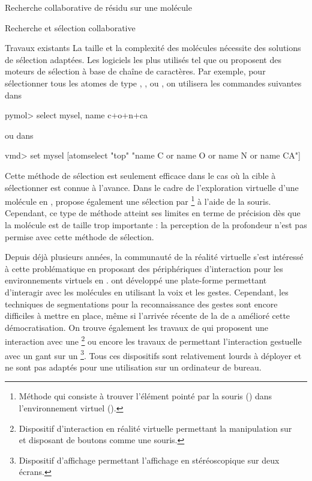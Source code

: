 \documentclass[myfrancais,ngerman,english,frenchb]{mythesis}
\begin{document}
\begin{mychapter}{Recherche collaborative de résidu sur une molécule}
\begin{mysection}{Recherche et sélection collaborative}
\begin{mysubsection}{Travaux existants}
				La taille et la complexité des molécules nécessite des solutions de sélection adaptées.
				Les logiciels les plus utilisés tel que \myPyMOL ou  proposent des moteurs de sélection à base de chaîne de caractères.
				Par exemple, pour sélectionner tous les atomes de type , ,  ou , on utilisera les commandes suivantes dans \myPyMOL
				\begin{mySource*}[language={}]
pymol> select mysel, name c+o+n+ca
				\end{mySource*}
				ou dans 
				\begin{mySource*}[language={}]
vmd> set mysel [atomselect "top" "name C or name O or name N or name CA"]
				\end{mySource*}
				Cette méthode de sélection est seulement efficace dans le cas où la cible à sélectionner est connue à l'avance.
				Dans le cadre de l'exploration virtuelle d'une molécule en \myThreeD,  propose également une sélection par \footnote{Méthode qui consiste à trouver l'élément pointé par la souris (\myTwoD) dans l'environnement virtuel (\myThreeD).} à l'aide de la souris.
				Cependant, ce type de méthode atteint ses limites en terme de précision dès que la molécule est de taille trop importante : la perception de la profondeur n'est pas permise avec cette méthode de sélection.

				Depuis déjà plusieurs années, la communauté de la réalité virtuelle s'est intéressé à cette problématique en proposant des périphériques d'interaction pour les environnements virtuels en \myThreeD.
				 ont développé une plate-forme permettant d'interagir avec les molécules en utilisant la voix et les gestes.
				Cependant, les techniques de segmentations pour la reconnaissance des gestes sont encore difficiles à mettre en place, même si l'arrivée récente de la \myKinect de \myMicrosoft a amélioré cette démocratisation.
				On trouve également les travaux de  qui proposent une interaction avec une \footnote{Dispositif d'interaction en réalité virtuelle permettant la manipulation sur ~ et disposant de boutons comme une souris.} ou encore les travaux de  permettant l'interaction gestuelle avec un gant sur un \footnote{Dispositif d'affichage permettant l'affichage en \myThreeD stéréoscopique sur deux écrans.}.
				Tous ces dispositifs sont relativement lourds à déployer et ne sont pas adaptés pour une utilisation sur un ordinateur de bureau.


\end{mysubsection}
\end{mysection}
\end{mychapter}
\end{document}
